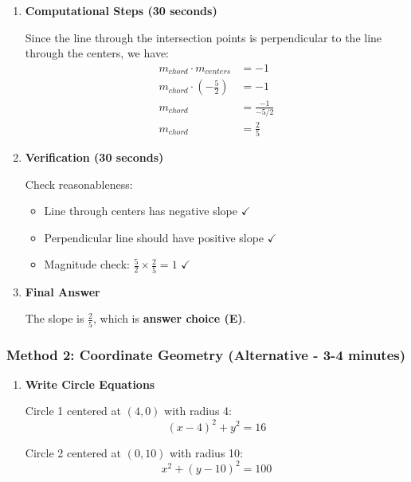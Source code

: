 \documentclass[12pt]{article}
\begin{document}
\begin{solutionbox}
\begin{enumerate}[leftmargin=*]
    \item \textbf{Computational Steps (30 seconds)}
    
    Since the line through the intersection points is perpendicular to the line through the centers, we have:
    \begin{align*}
        m_{chord} \cdot m_{centers} &= -1 \\
        m_{chord} \cdot \left(-\frac{5}{2}\right) &= -1 \\
        m_{chord} &= \frac{-1}{-5/2} \\
        m_{chord} &= \frac{2}{5}
    \end{align*}
    
    \item \textbf{Verification (30 seconds)}
    
    Check reasonableness:
    \begin{itemize}
        \item Line through centers has negative slope $\checkmark$
        \item Perpendicular line should have positive slope $\checkmark$
        \item Magnitude check: $\frac{5}{2} \times \frac{2}{5} = 1$ $\checkmark$
    \end{itemize}
    
    \item \textbf{Final Answer}
    
    The slope is $\frac{2}{5}$, which is \textbf{answer choice (E)}.
\end{enumerate}

\subsubsection*{Method 2: Coordinate Geometry (Alternative - 3-4 minutes)}

\begin{enumerate}[leftmargin=*]
    \item \textbf{Write Circle Equations}
    
    Circle 1 centered at $(4, 0)$ with radius 4:
    \begin{equation}
        (x-4)^2 + y^2 = 16
    \end{equation}
    
    Circle 2 centered at $(0, 10)$ with radius 10:
    \begin{equation}
        x^2 + (y-10)^2 = 100
    \end{equation}
    

\end{enumerate}
\end{solutionbox}
\end{document}

